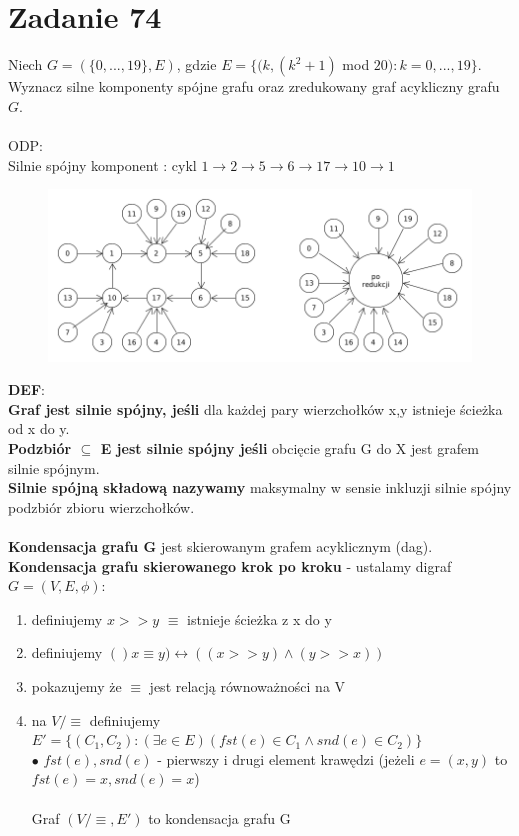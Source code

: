 \documentclass{article}
\begin{document}
\section{\centering Zadanie 74}
Niech $G = (\{0, ..., 19\},E)$, gdzie $E = \{(k,(k^{2}+1)$ mod $20) : k = 0, ..., 19\}$. Wyznacz silne komponenty spójne grafu oraz zredukowany graf acykliczny grafu $G$. \\\\
ODP: \\
Silnie spójny komponent : cykl $1 \rightarrow 2 \rightarrow 5 \rightarrow 6 \rightarrow 17 \rightarrow 10 \rightarrow 1$\\
\begin{figure}[H]
	\centering
	\includegraphics[width=1.0\linewidth]{z74.png}  
\end{figure}
\noindent \textbf{DEF}:\\
\textbf{Graf jest silnie spójny, jeśli} dla każdej pary wierzchołków x,y istnieje ścieżka od x do y.\\ 
\textbf{Podzbiór $\subseteq$ E jest silnie spójny jeśli} obcięcie grafu G do X jest grafem silnie spójnym. \\ \textbf{Silnie spójną składową nazywamy} maksymalny w sensie inkluzji silnie spójny podzbiór zbioru wierzchołków. \\\\
\textbf{Kondensacja grafu G} jest skierowanym grafem acyklicznym (dag).\\
\textbf{Kondensacja grafu skierowanego krok po kroku} - ustalamy digraf $G = (V,E,\phi)$:
\begin{enumerate}
	\item definiujemy $x>>y$ $\equiv$ istnieje ścieżka z x do y
	\item definiujemy $()x \equiv y) \leftrightarrow ((x >> y) \land (y >> x))$
	\item pokazujemy że $\equiv$ jest relacją równoważności na V
	\item na $V/\equiv$ definiujemy $E' = \{(C_{1},C_{2}) : (\exists e \in E)(fst(e) \in C_{1} \land snd(e) \in C_{2})\}$\\
	$\bullet$ $fst(e),snd(e)$ - pierwszy i drugi element krawędzi (jeżeli $e = (x,y)$ to $fst(e)=x,snd(e) = x$)\\\\
	Graf $(V/\equiv,E')$ to kondensacja grafu G
\end{enumerate}
\end{document}
